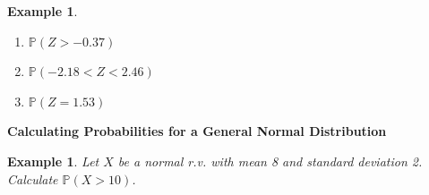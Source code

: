 \documentclass[12pt]{amsart}
\newtheorem{example}[theorem]{Example}
\newcommand{\bP}{\mathbb{P}}
\begin{document}
{\begin{example}
\begin{enumerate}
\item $\bP( Z > -0.37 ) $
%

\vfill


\item $\bP( -2.18 < Z < 2.46 )$
%

\vfill


\item $\bP(Z = 1.53 ) $

\end{enumerate}


\end{example} 


\newpage



\newpage
\textbf{Calculating Probabilities for a General Normal Distribution} \newline

\begin{example}  Let $X$ be a normal r.v. with mean 8 and standard deviation 2.  \newline
Calculate $\bP(X>10)$.
\end{example} 


}
\end{document}
